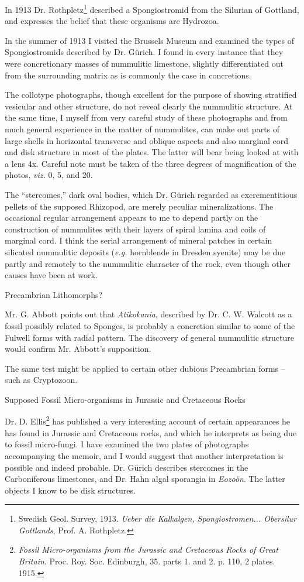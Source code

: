 \documentclass[a4paper, 12pt, oneside]{article}
\begin{document}
In 1913 Dr. Rothpletz\footnote{Swedish Geol. Survey, 1913. \emph{Ueber die Kalkalgen, Spongiostromen... Obersilur Gottlands}, Prof. A. Rothpletz.} described a Spongiostromid from the Silurian of Gottland, and expresses the belief that these organisms are Hydrozoa.

In the summer of 1913 I visited the Brussels Museum and examined the types of Spongiostromids described by Dr. Gürich. I found in every instance that they were concretionary masses of nummulitic limestone, slightly differentiated out from the surrounding matrix as is commonly the case in concretions.

The collotype photographs, though excellent for the purpose of showing stratified vesicular and other structure, do not reveal clearly the nummulitic structure. At the same time, I myself from very careful study of these photographs and from much general experience in the matter of nummulites, can make out parts of large shells in horizontal transverse and oblique aspects and also marginal cord and disk structure in most of the plates. The latter will bear being looked at with a lens 4x. Careful note must be taken of the three degrees of magnification of the photos, \emph{viz.} 0, 5, and 20.

The ``stercomes,'' dark oval bodies, which Dr. Gürich regarded as excrementitious pellets of the supposed Rhizopod, are merely peculiar mineralizations. The occasional regular arrangement appears to me to depend partly on the construction of nummulites with their layers of spiral lamina and coils of marginal cord. I think the serial arrangement of mineral patches in certain silicated nummulitic deposits (\emph{e.g.} hornblende in Dresden syenite) may be due partly and remotely to the nummulitic character of the rock, even though other causes have been at work.

Precambrian Lithomorphs?

Mr. G. Abbott points out that \emph{Atikokania}, described by Dr. C. W. Walcott as a fossil possibly related to Sponges, is probably a concretion similar to some of the Fulwell forms with radial pattern. The discovery of general nummulitic structure would confirm Mr. Abbott's supposition.

The same test might be applied to certain other dubious Precambrian forms -- such as Cryptozoon.

Supposed Fossil Micro-organisms in Jurassic and Cretaceous Rocks

Dr. D. Ellis\footnote{\emph{Fossil Micro-organisms from the Jurassic and Cretaceous Rocks of Great Britain}. Proc. Roy. Soc. Edinburgh, 35. parts 1. and 2. p. 110, 2 plates. 1915.} has published a very interesting account of certain appearances he has found in Jurassic and Cretaceous rocks, and which he interprets as being due to fossil micro-fungi. I have examined the two plates of photographs accompanying the memoir, and I would suggest that another interpretation is possible and indeed probable. Dr. Gürich describes stercomes in the Carboniferous limestones, and Dr. Hahn algal sporangia in \emph{Eozoön}. The latter objects I know to be disk structures.
\end{document}
